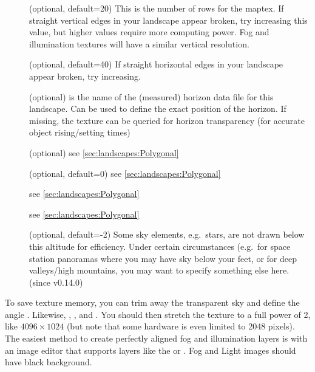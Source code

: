 \begin{description}
\item[] (optional, default=20) This is the number
  of rows for the maptex. If straight vertical edges in your landscape
  appear broken, try increasing this value, but higher values require
  more computing power. Fog and illumination textures will have a
  similar vertical resolution.
\item[] (optional, default=40) If straight
  horizontal edges in your landscape appear broken, try increasing.
\item[] (optional) is the name of the
  (measured) horizon data file for this landscape. Can be used to
  define the exact position of the horizon. If missing, the texture
  can be queried for horizon transparency (for accurate object
  rising/setting times)
\item[] (optional) see \ref{sec:landscapes:Polygonal}  %
\item[] (optional, default=0) see \ref{sec:landscapes:Polygonal}  %
\item[] see \ref{sec:landscapes:Polygonal}  %
\item[]  see \ref{sec:landscapes:Polygonal}  %
\item[] (optional, default=-2) Some sky
  elements, e.g.\ stars, are not drawn below this altitude for
  efficiency. Under certain circumstances (e.g.\ for space station
  panoramas where you may have sky below your feet, or for deep
  valleys/high mountains, you may want to specify something else
  here. (since v0.14.0)
\end{description}
%
To save texture memory, %
you can trim away the transparent
sky and define the angle . Likewise,
, ,  and
. You should then stretch the texture to a
full power of 2, like $4096\times1024$ (but note that some hardware is
even limited to 2048 pixels). The easiest method to create perfectly
aligned fog and illumination layers is with an image editor that
supports layers like the  or . Fog
and Light images should have black background.


